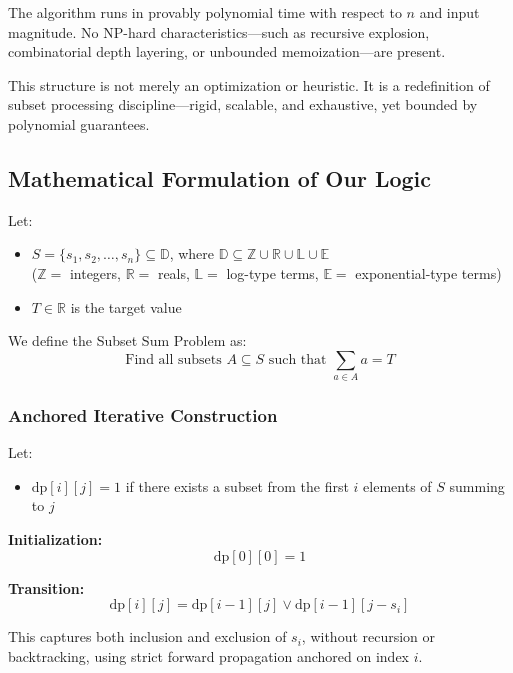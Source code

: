 \documentclass[11pt]{article}
\begin{document}
The algorithm runs in provably polynomial time with respect to $n$ and input magnitude. No NP-hard characteristics—such as recursive explosion, combinatorial depth layering, or unbounded memoization—are present.

This structure is not merely an optimization or heuristic. It is a redefinition of subset processing discipline—rigid, scalable, and exhaustive, yet bounded by polynomial guarantees.

\vspace{8em}
\subsection{Mathematical Formulation of Our Logic}

Let:
\begin{itemize}
    \item $S = \{s_1, s_2, \ldots, s_n\} \subseteq \mathbb{D}$, where $\mathbb{D} \subseteq \mathbb{Z} \cup \mathbb{R} \cup \mathbb{L} \cup \mathbb{E}$ \\
    ($\mathbb{Z} = $ integers, $\mathbb{R} = $ reals, $\mathbb{L} = $ log-type terms, $\mathbb{E} = $ exponential-type terms)
    \item $T \in \mathbb{R}$ is the target value
\end{itemize}

We define the Subset Sum Problem as:
\[
\text{Find all subsets } A \subseteq S \text{ such that } \sum_{a \in A} a = T
\]

\subsubsection{Anchored Iterative Construction}

Let:
\begin{itemize}
    \item $\text{dp}[i][j] = 1$ if there exists a subset from the first $i$ elements of $S$ summing to $j$
\end{itemize}

\textbf{Initialization:}
\[
\text{dp}[0][0] = 1
\]

\textbf{Transition:}
\[
\text{dp}[i][j] = \text{dp}[i-1][j] \lor \text{dp}[i-1][j - s_i]
\]

This captures both inclusion and exclusion of $s_i$, without recursion or backtracking, using strict forward propagation anchored on index $i$.

\vspace{1em}
\end{document}

